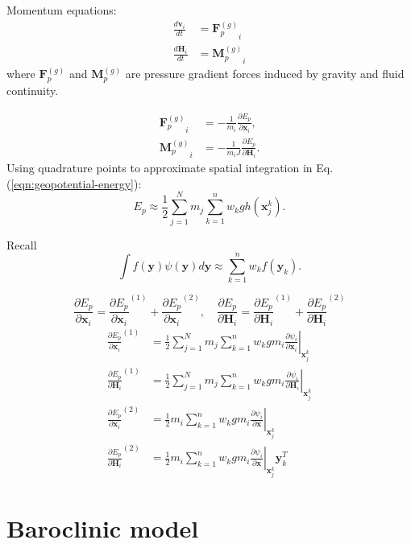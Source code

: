 \documentclass[slidestop,compress,mathserif]{beamer}
\begin{document}
\begin{frame}
  Momentum equations:
  \begin{align}
    \frac{d \mathbf{v}_i}{d t} & = {\mathbf{F}_p^{(g)}}_i \\
    \frac{d \dot{\mathbf{H}}_i}{d t} & = {\mathbf{M}_p^{(g)}}_i
  \end{align}
  where ${\mathbf{F}_p^{(g)}}$ and ${\mathbf{M}_p^{(g)}}$ are pressure gradient forces induced by gravity and fluid continuity.
\end{frame}

\begin{frame}
  \begin{align}
    {\mathbf{F}_p^{(g)}}_i & = - \frac{1}{m_i} \frac{\partial E_p}{\partial \mathbf{x}_i}, \\
    {\mathbf{M}_p^{(g)}}_i & = - \frac{1}{m_i J} \frac{\partial E_p}{\partial \mathbf{H}_i}.
  \end{align}
  Using quadrature points to approximate spatial integration in Eq. (\ref{eqn:geopotential-energy}):
  \begin{equation}
    E_p \approx \frac{1}{2} \sum_{j = 1}^{N} m_j \sum_{k = 1}^{n} w_k g h(\mathbf{x}_j^k).
  \end{equation}
  \begin{exampleblock}{Recall}
    \begin{equation*}
      \int{f(\mathbf{y}) \psi(\mathbf{y}) d\mathbf{y}} \approx \sum_{k = 1}^{n} w_k f(\mathbf{y}_k).
    \end{equation*}
  \end{exampleblock}
\end{frame}

\begin{frame}
  \begin{equation*}
    \frac{\partial E_p}{\partial \mathbf{x}_i} = {\frac{\partial E_p}{\partial \mathbf{x}_i}}^{(1)} + {\frac{\partial E_p}{\partial \mathbf{x}_i}}^{(2)}, \quad
    \frac{\partial E_p}{\partial \mathbf{H}_i} = {\frac{\partial E_p}{\partial \mathbf{H}_i}}^{(1)} + {\frac{\partial E_p}{\partial \mathbf{H}_i}}^{(2)}
  \end{equation*}
  \begin{align}
    {\frac{\partial E_p}{\partial \mathbf{x}_i}}^{(1)} & = \frac{1}{2} \sum_{j = 1}^{N} m_j \sum_{k = 1}^{n} w_k g m_i \left.\frac{\partial \psi_i}{\partial \mathbf{x}_i}\right|_{\mathbf{x}_j^k} \\
    {\frac{\partial E_p}{\partial \mathbf{H}_i}}^{(1)} & = \frac{1}{2} \sum_{j = 1}^{N} m_j \sum_{k = 1}^{n} w_k g m_i \left.\frac{\partial \psi_i}{\partial \mathbf{H}_i}\right|_{\mathbf{x}_j^k} \\
    {\frac{\partial E_p}{\partial \mathbf{x}_i}}^{(2)} & = \frac{1}{2} m_i \sum_{k = 1}^{n} w_k g m_i \left.\frac{\partial \psi_i}{\partial \mathbf{x}}\right|_{\mathbf{x}_j^k} \\
    {\frac{\partial E_p}{\partial \mathbf{H}_i}}^{(2)} & = \frac{1}{2} m_i \sum_{k = 1}^{n} w_k g m_i \left.\frac{\partial \psi_i}{\partial \mathbf{x}}\right|_{\mathbf{x}_j^k} \mathbf{y}_k^T
  \end{align}
\end{frame}

\section{Baroclinic model}
\label{sec:Baroclinic model}

\begin{frame}

\end{frame}
\end{document}
